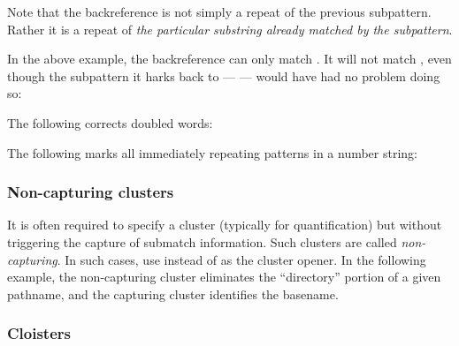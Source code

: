 {

\n Note that the backreference is not simply a repeat
of the previous subpattern.  Rather it is a repeat of
{\em the particular  substring already matched by the
subpattern}.

In the above example, the backreference can only match
.  It will not match , even
though the subpattern it harks back to --- \p{([a-z]+)}
---  would have had no problem doing so:


The following corrects doubled words:


The following marks all immediately repeating patterns
in a number string:


\subsubsection{Non-capturing clusters}

It is often required to specify a cluster
(typically for quantification) but without triggering
the capture of submatch information.  Such
clusters are called {\em non-capturing}.  In such cases,
use  instead of \p{(} as the cluster opener.  In
the following example, the  non-capturing cluster
eliminates the ``directory'' portion of a given
pathname, and the capturing cluster  identifies the
basename.


\subsubsection{Cloisters}

}
